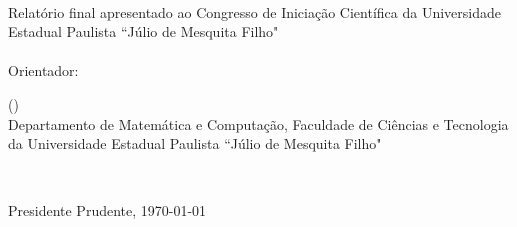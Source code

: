 \newpage
\thispagestyle{empty}
\begin{center}
    \nome\\
    \href{mailto:\email}{\email}
\end{center}
\vspace{2cm}
\begin{center}
    \titulo
\end{center}
\vspace{2cm}
Relatório final apresentado ao Congresso de Iniciação Científica da Universidade Estadual Paulista ``Júlio de Mesquita Filho"
\\
\vspace{3cm}
\\
Orientador:
\hspace{5mm}
\begin{minipage}[t]{11cm}
    \orientador\;(\href{mailto:\emailorientador}{\emailorientador})\\
    Departamento de Matemática e Computação, Faculdade de Ciências e Tecnologia da Universidade Estadual Paulista ``Júlio de Mesquita Filho"\\
\end{minipage}\\

\vspace*{\fill}

\begin{center}
    Presidente Prudente, \today
\end{center}